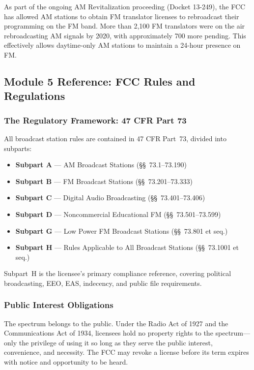 \documentclass[11pt,letterpaper]{article}
\begin{document}
\begin{asciibox}
As part of the ongoing AM Revitalization proceeding (Docket 13-249), the FCC has allowed AM
stations to obtain FM translator licenses to rebroadcast their programming on the FM band.
More than 2,100 FM translators were on the air rebroadcasting AM signals by 2020, with
approximately 700 more pending. This effectively allows daytime-only AM stations to maintain
a 24-hour presence on FM.

\subsection{Module 5 Reference: FCC Rules and Regulations}

\subsubsection{The Regulatory Framework: 47 CFR Part 73}

All broadcast station rules are contained in 47 CFR Part~73, divided into subparts:
\begin{itemize}[leftmargin=*]
  \item \textbf{Subpart A} --- AM Broadcast Stations (\S\S~73.1--73.190)
  \item \textbf{Subpart B} --- FM Broadcast Stations (\S\S~73.201--73.333)
  \item \textbf{Subpart C} --- Digital Audio Broadcasting (\S\S~73.401--73.406)
  \item \textbf{Subpart D} --- Noncommercial Educational FM (\S\S~73.501--73.599)
  \item \textbf{Subpart G} --- Low Power FM Broadcast Stations (\S\S~73.801 et seq.)
  \item \textbf{Subpart H} --- Rules Applicable to All Broadcast Stations (\S\S~73.1001 et seq.)
\end{itemize}

Subpart~H is the licensee's primary compliance reference, covering political broadcasting,
EEO, EAS, indecency, and public file requirements.

\subsubsection{Public Interest Obligations}

The spectrum belongs to the public. Under the Radio Act of 1927 and the Communications Act
of 1934, licensees hold no property rights to the spectrum---only the privilege of using it
so long as they serve the public interest, convenience, and necessity. The FCC may revoke a
license before its term expires with notice and opportunity to be heard.


\end{asciibox}
\end{document}
